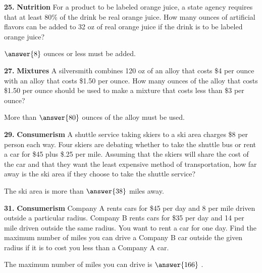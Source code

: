 \documentclass{ximera}
\begin{document}
\begin{problem}
\textbf{25.} \textbf{Nutrition} For a product to be labeled orange juice, a state agency
  requires that at least 80\% of the drink be real orange juice. How many ounces of
  artificial flavors can be added to 32 oz of real orange juice if the drink is to be
  labeled orange juice?

\( \answer{8} \) ounces or less must be added.
\end{problem}

\begin{problem}
\textbf{27.} \textbf{Mixtures} A silversmith combines 120 oz of an alloy that costs \$4 per
  ounce with an alloy that costs \$1.50 per ounce. How many ounces of the alloy that costs
  \$1.50 per ounce should be used to make a mixture that costs less than \$3 per ounce?

More than \( \answer{80} \) ounces of the alloy must be used.
\end{problem}

\begin{problem}
\textbf{29.} \textbf{Consumerism} A shuttle service taking skiers to a ski area charges \$8 per
  person each way. Four skiers are debating whether to take the shuttle bus or rent a car
  for \$45 plus \$.25 per mile. Assuming that the skiers will share the cost of the car and
  that they want the least expensive method of transportation, how far away is the ski area
  if they choose to take the shuttle service?

The ski area is more than \( \answer{38} \) miles away.
\end{problem}

\begin{problem}
\textbf{31.} \textbf{Consumerism} Company A rents cars for \$45 per day and 8\textcent{} per
  mile driven outside a particular radius. Company B rents cars for \$35 per day and
  14\textcent{} per mile driven outside the same radius. You want to rent a car for one
  day. Find the maximum number of miles you can drive a Company B car outside the given
  radius if it is to cost you less than a Company A car.

The maximum number of miles you can drive is \( \answer{166}\) .
\end{problem}
\end{document}
